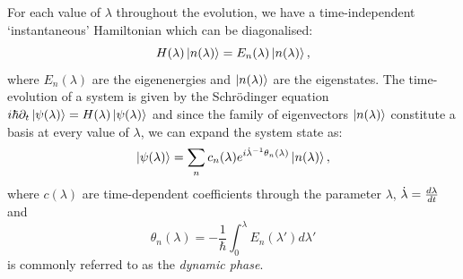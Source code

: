     For each value of $\lambda$ throughout the evolution, we have a time-independent `instantaneous' Hamiltonian which can be diagonalised:
    \begin{equation}\label{eq:instantaneous_schroedinger}
        H(\lambda)\ket{n(\lambda)} = E_n(\lambda)\ket{n(\lambda)},
    \end{equation}
    where $E_n(\lambda)$ are the eigenenergies and $\ket{n(\lambda)}$ are the eigenstates. The time-evolution of a system is given by the Schr\"{o}dinger equation $i\hbar \partial_t \ket{\psi(\lambda)} = H(\lambda) \ket{\psi(\lambda)}$ and since the family of eigenvectors $\ket{n(\lambda)}$ constitute a basis at every value of $\lambda$, we can expand the system state as:
    \begin{equation}\label{eq:adiabatic_basis_expansion}
        \ket{\psi(\lambda)} = \sum_n c_n(\lambda)e^{i \dot{\lambda}^{-1} \theta_n(\lambda)}\ket{n(\lambda)},
    \end{equation}
    where $c(\lambda)$ are time-dependent coefficients through the parameter $\lambda$, $\dot{\lambda} = \frac{d\lambda}{dt}$ and
    \begin{equation}\label{eq:dynamical_phase}
        \theta_n(\lambda) = -\frac{1}{\hbar} \int_0^{\lambda} E_n(\lambda') d\lambda'
    \end{equation}
    is commonly referred to as the \emph{dynamic phase}. 
    

